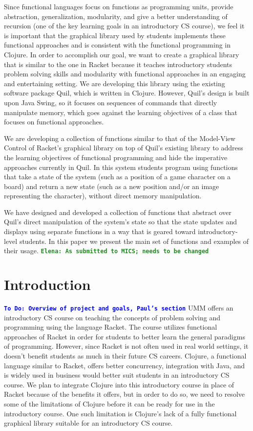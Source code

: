 \documentclass[12pt]{article}
\newcommand{\comment}[1]{{\bf \tt  {#1}}}
\newcommand{\emcomment}[1]{\textcolor{ForestGreen}{\comment{Elena: {#1}}}}
\newcommand{\todo}[1]{\textcolor{blue}{\comment{To Do: {#1}}}}
\begin{document}
Since functional languages focus on functions as programming units, provide abstraction, generalization, modularity, and give a better understanding of recursion (one of the key learning goals in an introductory CS course), we feel it is important that the graphical library used by students implements these functional approaches and is consistent with the functional programming in Clojure. In order to accomplish our goal, we want to create a graphical library that is similar to the one in Racket because it teaches introductory students problem solving skills and modularity with functional approaches in an engaging and entertaining setting. We are developing this library using the existing software package Quil, which is written in Clojure. However, Quil’s design is built upon Java Swing, so it focuses on sequences of commands that directly manipulate memory, which goes against the learning objectives of a class that focuses on functional approaches.

We are developing a collection of functions similar to that of the Model-View Control of Racket’s graphical library on top of Quil’s existing library to address the learning objectives of functional programming and hide the imperative approaches currently in Quil. In this system students program using functions that take a state of the system (such as a position of a game character on a board) and return a new state (such as a new position and/or an image representing the character), without direct memory manipulation.

We have designed and developed a collection of functions that abstract over Quil’s direct manipulation of the system’s state so that the state updates and displays using separate functions in a way that is geared toward introductory-level students. In this paper we present the main set of functions and examples of their usage. 
\emcomment{As submitted to MICS; needs to be changed}


\newpage
\setcounter{page}{1}

\section{Introduction}\label{sec:intro}
\todo{Overview of project and goals, Paul's section}
UMM offers an introductory CS course on teaching the concepts of problem solving and programming using the language Racket. The course utilizes functional approaches of Racket in order for students to better learn the general paradigms of programming.  However, since Racket is not often used in real world settings, it doesn’t benefit students as much in their future CS careers. Clojure, a functional language similar to Racket, offers better concurrency, integration with Java, and is widely used in business would better suit students in an introductory CS course.  We plan to integrate Clojure into this introductory course in place of Racket because of the benefits it offers, but in order to do so, we need to resolve some of the limitations of Clojure before it can be ready for use in the introductory course. One such limitation is Clojure’s lack of a fully functional graphical library suitable for an introductory CS course.  
\end{document}
